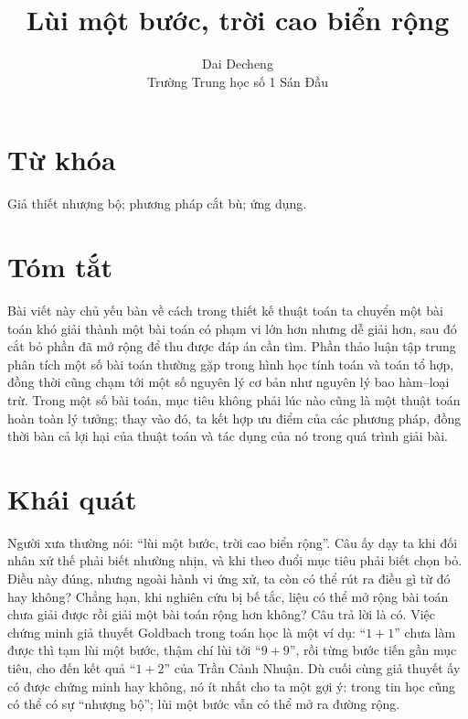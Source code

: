 \documentclass[11pt]{article}
\title{Lùi một bước, trời cao biển rộng}
\author{Dai Decheng\\Trường Trung học số 1 Sán Đầu}
\date{}
\begin{document}
\maketitle


\section*{Từ khóa}

Giả thiết nhượng bộ; phương pháp cắt bù; ứng dụng.

\section*{Tóm tắt}

Bài viết này chủ yếu bàn về cách trong thiết kế thuật toán ta chuyển một bài
toán khó giải thành một bài toán có phạm vi lớn hơn nhưng dễ giải hơn, sau đó
cắt bỏ phần đã mở rộng để thu được đáp án cần tìm. Phần thảo luận tập trung
phân tích một số bài toán thường gặp trong hình học tính toán và toán tổ hợp,
đồng thời cũng chạm tới một số nguyên lý cơ bản như nguyên lý bao hàm--loại
trừ. Trong một số bài toán, mục tiêu không phải lúc nào cũng là một thuật toán
hoàn toàn lý tưởng; thay vào đó, ta kết hợp ưu điểm của các phương pháp, đồng
thời bàn cả lợi hại của thuật toán và tác dụng của nó trong quá trình giải
bài.

\section{Khái quát}

Người xưa thường nói: ``lùi một bước, trời cao biển rộng''. Câu ấy dạy ta khi
đối nhân xử thế phải biết nhường nhịn, và khi theo đuổi mục tiêu phải biết
chọn bỏ. Điều này đúng, nhưng ngoài hành vi ứng xử, ta còn có thể rút ra điều
gì từ đó hay không? Chẳng hạn, khi nghiên cứu bị bế tắc, liệu có thể mở rộng
bài toán chưa giải được rồi giải một bài toán rộng hơn không? Câu trả lời là
có. Việc chứng minh giả thuyết Goldbach trong toán học là một ví dụ: ``$1+1$''
chưa làm được thì tạm lùi một bước, thậm chí lùi tới ``$9+9$'', rồi từng bước
tiến gần mục tiêu, cho đến kết quả ``$1+2$'' của Trần Cảnh Nhuận. Dù cuối cùng
giả thuyết ấy có được chứng minh hay không, nó ít nhất cho ta một gợi ý: trong
tin học cũng có thể có sự ``nhượng bộ''; lùi một bước vẫn có thể mở ra đường
rộng.
\end{document}
